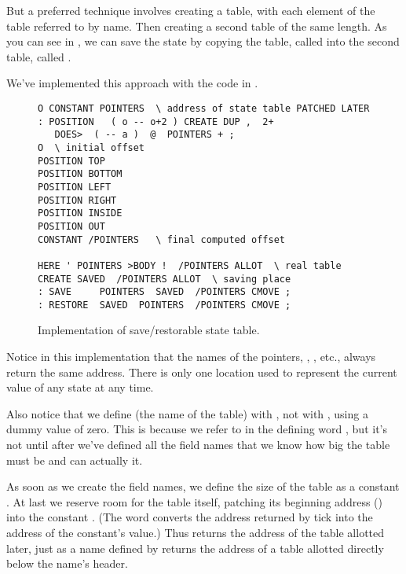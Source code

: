 But a preferred technique involves creating a table, with each
element of the table referred to by name. Then creating a second table of
the same length. As you can see in , we can save the state by
copying the table, called  into the second table, called
.



We've implemented this approach with the code in .

\begin{figure*}[tttt]
\caption{Implementation of save/restorable state table.}
\begin{center}
\begin{BVerbatim}
O CONSTANT POINTERS  \ address of state table PATCHED LATER
: POSITION   ( o -- o+2 ) CREATE DUP ,  2+
   DOES>  ( -- a )  @  POINTERS + ;
O  \ initial offset
POSITION TOP
POSITION BOTTOM
POSITION LEFT
POSITION RIGHT
POSITION INSIDE
POSITION OUT
CONSTANT /POINTERS   \ final computed offset

HERE ' POINTERS >BODY !  /POINTERS ALLOT  \ real table
CREATE SAVED  /POINTERS ALLOT  \ saving place
: SAVE     POINTERS  SAVED  /POINTERS CMOVE ;
: RESTORE  SAVED  POINTERS  /POINTERS CMOVE ;
\end{BVerbatim}
\end{center}
\end{figure*}

Notice in this implementation that the names of the pointers,
, , etc., always return the same address.
There is only one location used to represent the current value of any
state at any time.

Also notice that we define  (the name of the table)
with , not with , using a dummy value of
zero. This is because we refer to  in the defining
word , but it's not until after we've defined all the
field names that we know how big the table must be and can actually
 it.

As soon as we create the field names, we define the size of the table
as a constant . At last we reserve room for the table
itself, patching its beginning address () into the
constant .  (The word  converts the
address returned by tick into the address of the constant's value.)
Thus  returns the address of the table allotted later,
just as a name defined by  returns the address of a
table allotted directly below the name's header.

